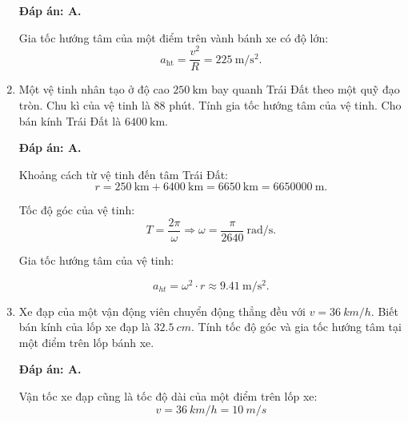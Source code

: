 \begin{enumerate}[label=\bfseries Câu \arabic*:]
	\hideall
	{	
		\textbf{Đáp án: A.}
		
		Gia tốc hướng tâm của một điểm trên vành bánh xe có độ lớn:
		$$a_\text{ht}=\dfrac{v^2}{R}=\SI{225}{\meter/\second^2}.$$
	}
	\item {}
	
	
	{
		Một vệ tinh nhân tạo ở độ cao $\SI{250}{\kilo\meter}$ bay quanh Trái Đất theo một quỹ đạo tròn. Chu kì của vệ tinh là 88 phút. Tính gia tốc hướng tâm của vệ tinh. Cho bán kính Trái Đất là $\SI{6400}{\kilo\meter}$.
	}
	
	\hideall
	{	
		\textbf{Đáp án: A.}
		
		Khoảng cách từ vệ tinh đến tâm Trái Đất: 
		$$r=\SI{250}{\kilo\meter}+\SI{6400}{\kilo\meter} =\SI{6650}{\kilo\meter}=\SI{6650000}{\meter}.$$
		
		Tốc độ góc của vệ tinh:
		$$T=\frac{2\pi}{\omega} \Rightarrow \omega = \frac{\pi}{2640}\ \text{rad/s}.$$ 
		
		Gia tốc hướng tâm của vệ tinh: 
		
		$$a_{ht}=\omega^2 \cdot r \approx \SI{9,41}{ \meter/\second^2}.$$
	}
	\item {}
	
	
	{
		Xe đạp của một vận động viên chuyển động thẳng đều với $v=\SI{36}{km/h}$. Biết bán kính của lốp xe đạp là $\SI{32.5}{cm}$. Tính tốc độ góc và gia tốc hướng tâm tại một điểm trên lốp bánh xe.
	}
	
	\hideall
	{	
		\textbf{Đáp án: A.}
		
		Vận tốc xe đạp cũng là tốc độ dài của một điểm trên lốp xe:
		$$v=\SI{36}{km/h} = \SI{10}{m/s}$$
		
}
\end{enumerate}
